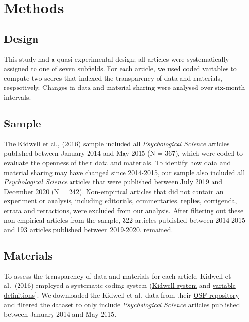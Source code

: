 \documentclass[
  english,
  man,floatsintext]{apa6}
\begin{document}
\hypertarget{methods}{%
\section{Methods}\label{methods}}

\hypertarget{design}{%
\subsection{Design}\label{design}}

This study had a quasi-experimental design; all articles were systematically assigned to one of seven subfields. For each article, we used coded variables to compute two scores that indexed the transparency of data and materials, respectively. Changes in data and material sharing were analysed over six-month intervals.

\hypertarget{sample}{%
\subsection{Sample}\label{sample}}

The Kidwell et al., (2016) sample included all \emph{Psychological Science} articles published between January 2014 and May 2015 (N = 367), which were coded to evaluate the openness of their data and materials. To identify how data and material sharing may have changed since 2014-2015, our sample also included all \emph{Psychological Science} articles that were published between July 2019 and December 2020 (N = 242). Non-empirical articles that did not contain an experiment or analysis, including editorials, commentaries, replies, corrigenda, errata and retractions, were excluded from our analysis. After filtering out these non-empirical articles from the sample, 322 articles published between 2014-2015 and 193 articles published between 2019-2020, remained.

\hypertarget{materials}{%
\subsection{Materials}\label{materials}}

To assess the transparency of data and materials for each article, Kidwell et al.~(2016) employed a systematic coding system (\href{https://osf.io/j4x23/?view_only=b97cd4c4f6d645bc9e8870d97b6f3da4}{Kidwell system} and \href{https://osf.io/n7grj/?view_only=b97cd4c4f6d645bc9e8870d97b6f3da4}{variable definitions}). We downloaded the Kidwell et al.~data from their \href{https://osf.io/rfgdw/}{OSF repository} and filtered the dataset to only include \emph{Psychological Science} articles published between January 2014 and May 2015.
\end{document}
